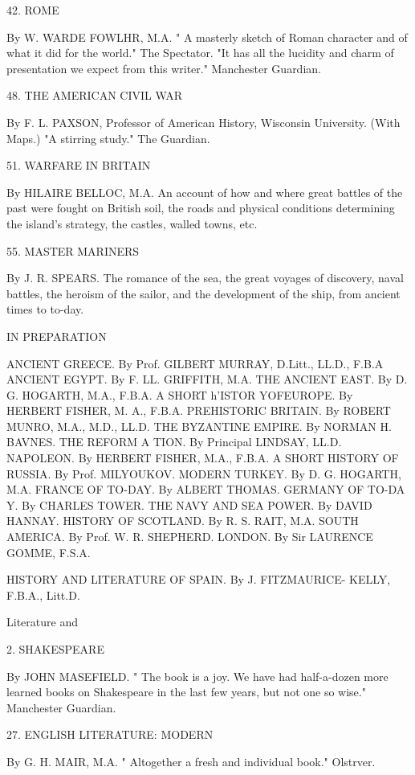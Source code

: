 \documentclass[12pt,leqno]{book}[2005/09/16]
\begin{document}
42. ROME

By W. WARDE FOWLHR, M.A. " A masterly sketch of Roman character and
of what it did for the world." The Spectator. "It has all the lucidity and
charm of presentation we expect from this writer." Manchester Guardian.

48. THE AMERICAN CIVIL WAR

By F. L. PAXSON, Professor of American History, Wisconsin University.
(With Maps.) "A stirring study." The Guardian.

51. WARFARE IN BRITAIN

By HILAIRE BELLOC, M.A. An account of how and where great battles of the
past were fought on British soil, the roads and physical conditions determining
the island's strategy, the castles, walled towns, etc.

55. MASTER MARINERS

By J. R. SPEARS. The romance of the sea, the great voyages of discovery,
naval battles, the heroism of the sailor, and the development of the ship, from
ancient times to to-day.

IN PREPARATION

ANCIENT GREECE. By Prof. GILBERT MURRAY, D.Litt., LL.D., F.B.A
ANCIENT EGYPT. By F. LL. GRIFFITH, M.A.
THE ANCIENT EAST. By D. G. HOGARTH, M.A., F.B.A.
A SHORT h'ISTOR YOFEUROPE. By HERBERT FISHER, M. A., F.B.A.
PREHISTORIC BRITAIN. By ROBERT MUNRO, M.A., M.D., LL.D.
THE BYZANTINE EMPIRE. By NORMAN H. BAVNES.
THE REFORM A TION. By Principal LINDSAY, LL.D.
NAPOLEON. By HERBERT FISHER, M.A., F.B.A.
A SHORT HISTORY OF RUSSIA. By Prof. MILYOUKOV.
MODERN TURKEY. By D. G. HOGARTH, M.A.
FRANCE OF TO-DAY. By ALBERT THOMAS.
GERMANY OF TO-DA Y. By CHARLES TOWER.
THE NAVY AND SEA POWER. By DAVID HANNAY.
HISTORY OF SCOTLAND. By R. S. RAIT, M.A.
SOUTH AMERICA. By Prof. W. R. SHEPHERD.
LONDON. By Sir LAURENCE GOMME, F.S.A.

HISTORY AND LITERATURE OF SPAIN. By J. FITZMAURICE-
KELLY, F.B.A., Litt.D.



Literature and



2. SHAKESPEARE

By JOHN MASEFIELD. " The book is a joy. We have had half-a-dozen more
learned books on Shakespeare in the last few years, but not one so wise."
Manchester Guardian.

27. ENGLISH LITERATURE: MODERN

By G. H. MAIR, M.A. " Altogether a fresh and individual book." Olstrver.
\end{document}
